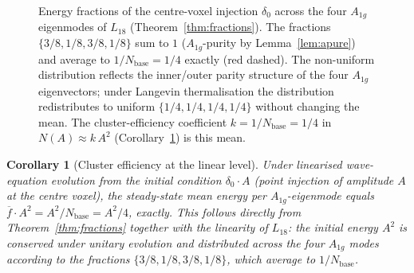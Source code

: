 \documentclass[11pt,reqno]{amsart}
\theoremstyle{plain}
\newtheorem{corollary}[theorem]{Corollary}
\theoremstyle{definition}
\theoremstyle{remark}
\numberwithin{equation}{section}
\newcommand{\Aoneg}{A_{1g}}
\newcommand{\Nbase}{N_{\mathrm{base}}}
\begin{document}
\begin{figure}[h]
\centering
{}
\caption{Energy fractions of the centre-voxel injection $\delta_{0}$
across the four $\Aoneg$ eigenmodes of $L_{18}$
(Theorem~\ref{thm:fractions}). The fractions $\{3/8, 1/8, 3/8, 1/8\}$
sum to $1$ ($\Aoneg$-purity by Lemma~\ref{lem:apure}) and average to
$1/\Nbase = 1/4$ exactly (red dashed). The non-uniform distribution
reflects the inner/outer parity structure of the four $\Aoneg$
eigenvectors; under Langevin thermalisation the distribution
redistributes to uniform $\{1/4, 1/4, 1/4, 1/4\}$ without changing
the mean. The cluster-efficiency coefficient $k = 1/\Nbase = 1/4$ in
$N(A) \approx k\,A^{2}$ (Corollary~\ref{cor:k}) is this mean.}
\label{fig:fractions}
\end{figure}

\begin{corollary}[Cluster efficiency at the linear level]
\label{cor:k}
Under linearised wave-equation evolution from the initial condition
$\delta_{0}\cdot A$ (point injection of amplitude $A$ at the centre
voxel), the steady-state mean energy per $\Aoneg$-eigenmode equals
$\overline{f}\cdot A^{2} = A^{2}/\Nbase = A^{2}/4$, exactly. This
follows directly from Theorem~\ref{thm:fractions} together with the
linearity of $L_{18}$: the initial energy $A^{2}$ is conserved under
unitary evolution and distributed across the four $\Aoneg$ modes
according to the fractions $\{3/8, 1/8, 3/8, 1/8\}$, which average
to $1/\Nbase$.
\end{corollary}
\end{document}
